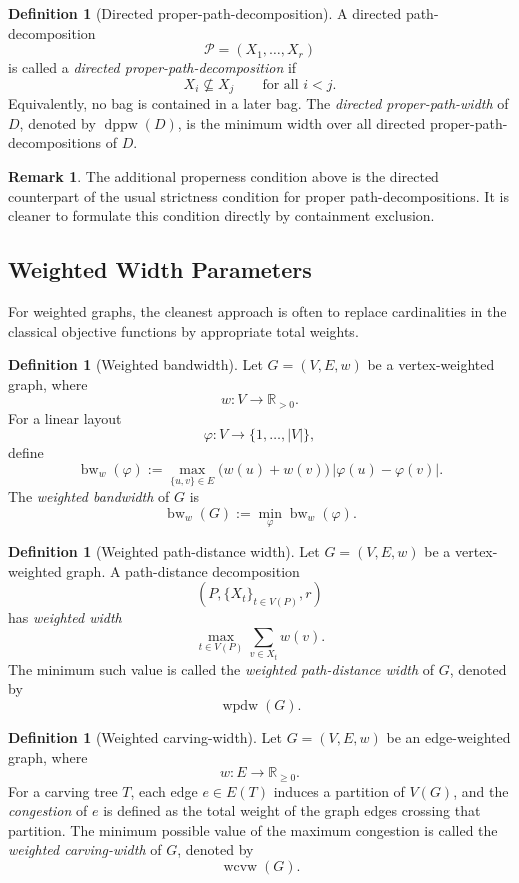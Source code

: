 \documentclass[10pt]{book}
\theoremstyle{definition}
\newtheorem{remark}[theorem]{Remark}
\newtheorem{definition}[theorem]{Definition}
\begin{document}
\begin{definition}[Directed proper-path-decomposition]
A directed path-decomposition
\[
\mathcal{P}=(X_1,\dots,X_r)
\]
is called a \emph{directed proper-path-decomposition} if
\[
X_i\not\subseteq X_j
\qquad
\text{for all } i<j.
\]
Equivalently, no bag is contained in a later bag.
The \emph{directed proper-path-width} of \(D\), denoted by \(\operatorname{dppw}(D)\), is the minimum width over all directed proper-path-decompositions of \(D\).
\end{definition}

\begin{remark}
The additional properness condition above is the directed counterpart of the usual strictness condition for proper path-decompositions.
It is cleaner to formulate this condition directly by containment exclusion.
\end{remark}

\subsection{Weighted Width Parameters}

For weighted graphs, the cleanest approach is often to replace cardinalities in the classical objective functions by appropriate total weights.

\begin{definition}[Weighted bandwidth]
Let \(G=(V,E,w)\) be a vertex-weighted graph, where
\[
w:V\to \mathbb{R}_{>0}.
\]
For a linear layout
\[
\varphi:V\to \{1,\dots,|V|\},
\]
define
\[
\operatorname{bw}_w(\varphi):=
\max_{\{u,v\}\in E}
\bigl(w(u)+w(v)\bigr)\,|\varphi(u)-\varphi(v)|.
\]
The \emph{weighted bandwidth} of \(G\) is
\[
\operatorname{bw}_w(G):=
\min_{\varphi}\operatorname{bw}_w(\varphi).
\]
\end{definition}

\begin{definition}[Weighted path-distance width]
Let \(G=(V,E,w)\) be a vertex-weighted graph.
A path-distance decomposition
\[
(P,\{X_t\}_{t\in V(P)},r)
\]
has \emph{weighted width}
\[
\max_{t\in V(P)} \sum_{v\in X_t} w(v).
\]
The minimum such value is called the \emph{weighted path-distance width} of \(G\), denoted by
\[
\operatorname{wpdw}(G).
\]
\end{definition}

\begin{definition}[Weighted carving-width]
Let \(G=(V,E,w)\) be an edge-weighted graph, where
\[
w:E\to \mathbb{R}_{\ge 0}.
\]
For a carving tree \(T\), each edge \(e\in E(T)\) induces a partition of \(V(G)\), and the \emph{congestion} of \(e\) is defined as the total weight of the graph edges crossing that partition.
The minimum possible value of the maximum congestion is called the \emph{weighted carving-width} of \(G\), denoted by
\[
\operatorname{wcvw}(G).
\]
\end{definition}
\end{document}
